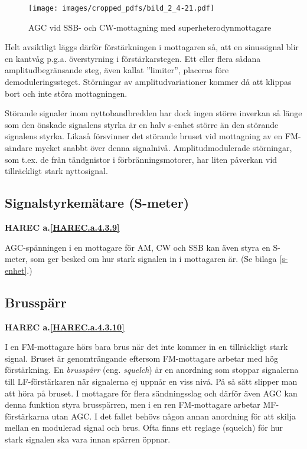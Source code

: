 \begin{figure}
  \texttt{[image: images/cropped\_pdfs/bild\_2\_4-21.pdf]}
  \caption{AGC vid SSB- och CW-mottagning med superheterodynmottagare}
  \label{fig:bildII4-21}
\end{figure}

Helt avsiktligt läggs därför förstärkningen i mottagaren så, att en
sinussignal blir en kantvåg p.g.a. överstyrning i förstärkarstegen.
Ett eller flera sådana amplitudbegränsande steg, även kallat ''limiter'',
placeras före demoduleringssteget.
Störningar av amplitudvariationer kommer då att klippas bort och inte störa
mottagningen.

Störande signaler inom nyttobandbredden har dock ingen större inverkan
så länge som den önskade signalens styrka är en halv s-enhet större än
den störande signalens styrka.
Likaså försvinner det störande bruset vid mottagning av en FM-sändare mycket
snabbt över denna signalnivå.
Amplitudmodulerade störningar, som t.ex. de från tändgnistor i
förbränningsmotorer, har liten påverkan vid tillräckligt stark nyttosignal.

\subsection{Signalstyrkemätare (S-meter)}
\textbf{HAREC a.\ref{HAREC.a.4.3.9}\label{myHAREC.a.4.3.9}}

AGC-spänningen i en mottagare för AM, CW och SSB kan även styra en
S-meter, som ger besked om hur stark signalen in i mottagaren är.
(Se bilaga \ref{s-enhet}.)

\subsection{Brusspärr}
\textbf{HAREC a.\ref{HAREC.a.4.3.10}\label{myHAREC.a.4.3.10}}

I en FM-mottagare hörs bara brus när det inte kommer in en tillräckligt stark
signal.
Bruset är genomträngande eftersom FM-mottagare arbetar med hög förstärkning.
En \emph{brusspärr} (eng. \emph{squelch}) är en anordning som stoppar
signalerna till LF-förstärkaren när signalerna ej uppnår en viss nivå.
På så sätt slipper man att höra på bruset.
I mottagare för flera sändningsslag och därför även AGC kan denna funktion
styra brusspärren, men i en ren FM-mottagare arbetar MF-förstärkarna utan AGC.
I det fallet behövs någon annan anordning för att skilja mellan en modulerad
signal och brus.
Ofta finns ett reglage (squelch) för hur stark signalen ska vara innan spärren
öppnar.

